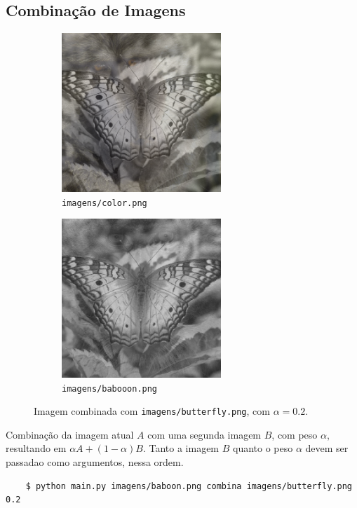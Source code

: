 \subsection{Combinação de Imagens}

\begin{figure}[H]
    \centering
    \begin{subfigure}{0.45\textwidth}
        \centering
        \includegraphics[width=6cm]{resultados/colormerg.png}
        \caption{\texttt{imagens/color.png}}
    \end{subfigure}%
    \begin{subfigure}{0.45\textwidth}
        \centering
        \includegraphics[width=6cm]{resultados/baboonmerg.png}
        \caption{\texttt{imagens/babooon.png}}
    \end{subfigure}

    \caption{Imagem combinada com \texttt{imagens/butterfly.png}, com $\alpha = 0.2$.}
\end{figure}

\newpage

Combinação da imagem atual $A$ com uma segunda imagem $B$, com peso $\alpha$, resultando em $\alpha A + (1 - \alpha) B$. Tanto a imagem $B$ quanto o peso $\alpha$ devem ser passadao como argumentos, nessa ordem.

\begin{verbatim}
    $ python main.py imagens/baboon.png combina imagens/butterfly.png 0.2
\end{verbatim}

